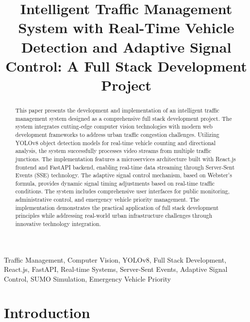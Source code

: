 \documentclass[conference]{IEEEtran}
\begin{document}
\title{Intelligent Traffic Management System with Real-Time Vehicle Detection and Adaptive Signal Control: A Full Stack Development Project}

\author{
}

\maketitle

\begin{abstract}
This paper presents the development and implementation of an intelligent traffic management system designed as a comprehensive full stack development project. The system integrates cutting-edge computer vision technologies with modern web development frameworks to address urban traffic congestion challenges. Utilizing YOLOv8 object detection models for real-time vehicle counting and directional analysis, the system successfully processes video streams from multiple traffic junctions. The implementation features a microservices architecture built with React.js frontend and FastAPI backend, enabling real-time data streaming through Server-Sent Events (SSE) technology. The adaptive signal control mechanism, based on Webster's formula, provides dynamic signal timing adjustments based on real-time traffic conditions. The system includes comprehensive user interfaces for public monitoring, administrative control, and emergency vehicle priority management. The implementation demonstrates the practical application of full stack development principles while addressing real-world urban infrastructure challenges through innovative technology integration.
\end{abstract}

\begin{IEEEkeywords}
Traffic Management, Computer Vision, YOLOv8, Full Stack Development, React.js, FastAPI, Real-time Systems, Server-Sent Events, Adaptive Signal Control, SUMO Simulation, Emergency Vehicle Priority
\end{IEEEkeywords}

\section{Introduction}
\end{document}
